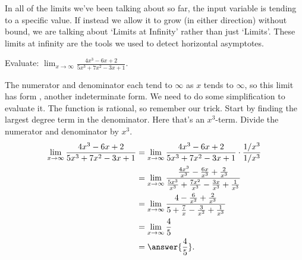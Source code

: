 \documentclass{ximera}
\begin{document}
In all of the limits we've been talking about so far, the input variable is tending to a specific value.  If instead we allow it to grow (in either direction) without bound, we are talking about
`Limits at Infinity' rather than just `Limits'.  These limits at infinity are the tools we used to detect horizontal asymptotes.
\begin{example}
	Evaluate: $\displaystyle \lim_{x\to \infty} \frac{4x^3-6x+2}{5x^3+7x^2-3x+1}$.
	\begin{explanation}
		The numerator and denominator each tend to $\infty$ as $x$ tends to $\infty$, so this limit has form \inftyOverInfty, another indeterminate form.  We need to do some simplification to evaluate it.  
		The function is rational, so remember our trick.  Start by finding the largest degree term in the denominator.  Here that's an $x^3$-term.  Divide the numerator and denominator
		by $x^3$.
		\begin{align*}
			\lim_{x\to\infty} \frac{4x^3-6x+2}{5x^3+7x^2-3x+1} &= \lim_{x\to\infty} \frac{4x^3-6x+2}{5x^3+7x^2-3x+1} \cdot \frac{1/x^3}{1/x^3}\\
				&= \lim_{x\to\infty} \frac{\frac{4x^3}{x^3}-\frac{6x}{x^3}+\frac{2}{x^3}}{\frac{5x^3}{x^3}+\frac{7x^2}{x^3}-\frac{3x}{x^3}+\frac{1}{x^3}}\\
				&= \lim_{x\to\infty} \frac{4-\frac{6}{x^2}+\frac{2}{x^3}}{5+\frac{7}{x}-\frac{3}{x^2}+\frac{1}{x^3}}\\
				&= \lim_{x\to\infty}\frac{4}{5}\\
				&= \answer{\frac{4}{5}}.
		\end{align*}
	\end{explanation}
\end{example}
\end{document}
